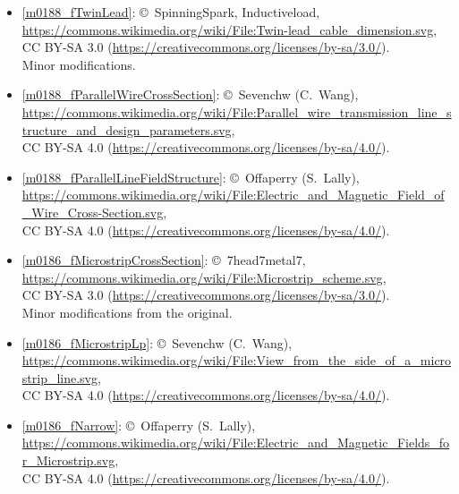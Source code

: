 \begin{itemize}

\item[Fig.] \label{m0188_fTwinLead_Credit}
  \ref{m0188_fTwinLead}:
  \copyright~SpinningSpark, Inductiveload, 
  \url{https://commons.wikimedia.org/wiki/File:Twin-lead_cable_dimension.svg},\\ 
  CC BY-SA 3.0 (\url{https://creativecommons.org/licenses/by-sa/3.0/}).\\
  Minor modifications.

\item[Fig.] \label{m0188_fParallelWireCrossSection_Credit}
  \ref{m0188_fParallelWireCrossSection}:
  \copyright~Sevenchw (C.\ Wang), 
  \url{https://commons.wikimedia.org/wiki/File:Parallel_wire_transmission_line_structure_and_design_parameters.svg},\\ 
  CC BY-SA 4.0 (\url{https://creativecommons.org/licenses/by-sa/4.0/}).

\item[Fig.] \label{m0188_fParallelLineFieldStructure_Credit}
  \ref{m0188_fParallelLineFieldStructure}:
  \copyright~Offaperry (S.\ Lally), 
  \url{https://commons.wikimedia.org/wiki/File:Electric_and_Magnetic_Field_of_Wire_Cross-Section.svg},\\ 
  CC BY-SA 4.0 (\url{https://creativecommons.org/licenses/by-sa/4.0/}).

\item[Fig.] \label{m0186_fMicrostripCrossSection_Credit}
  \ref{m0186_fMicrostripCrossSection}:
  \copyright~7head7metal7, 
  \url{https://commons.wikimedia.org/wiki/File:Microstrip_scheme.svg},\\ 
  CC BY-SA 3.0 (\url{https://creativecommons.org/licenses/by-sa/3.0/}).\\
  Minor modifications from the original.

\item[Fig.] \label{m0186_fMicrostripLp_Credit}
  \ref{m0186_fMicrostripLp}:
  \copyright~Sevenchw (C.\ Wang), 
  \url{https://commons.wikimedia.org/wiki/File:View_from_the_side_of_a_microstrip_line.svg},\\ 
  CC BY-SA 4.0 (\url{https://creativecommons.org/licenses/by-sa/4.0/}).

\item[Fig.] \label{m0186_fNarrow_Credit}
  \ref{m0186_fNarrow}:
  \copyright~Offaperry (S.\ Lally), 
  \url{https://commons.wikimedia.org/wiki/File:Electric_and_Magnetic_Fields_for_Microstrip.svg},\\ 
  CC BY-SA 4.0 (\url{https://creativecommons.org/licenses/by-sa/4.0/}).

\end{itemize}

\twocolumn
